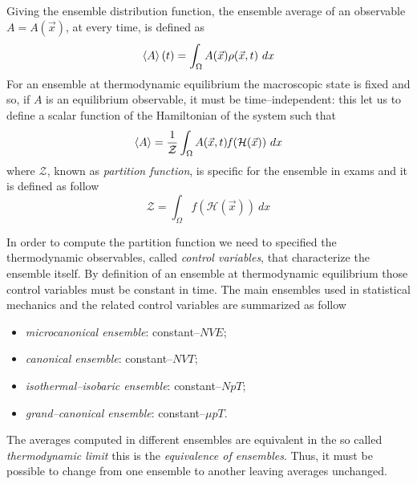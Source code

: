Giving the ensemble distribution function, the ensemble average of an observable $A=A(\vec x)$, at every time, is defined as
\begin{equation*}
	\left \langle A \right \rangle(t) = \int_\Omega A(\vec x)\rho(\vec x, t)\ dx
\end{equation*}
For an ensemble at thermodynamic equilibrium the macroscopic state is fixed and so, if $A$ is an equilibrium observable, it must be time--independent: this let us to define a scalar function of the Hamiltonian of the system such that
\begin{equation*}
	\left \langle A \right \rangle = \frac{1}{\mathcal{Z}} \int_\Omega A(\vec x, t) \mathit{f}(\mathcal{H}(\vec x))\ dx
\end{equation*}
where $\mathcal{Z}$, known as \textit{partition function}, is specific for the ensemble in exams and it is defined as follow
\begin{equation*}
	\mathcal{Z} = \int_\Omega \mathit{f}(\mathcal{H}(\vec x))\ dx
\end{equation*}

In order to compute the partition function we need to specified the thermodynamic observables, called \textit{control variables}, that characterize the ensemble itself. By definition of an ensemble at thermodynamic equilibrium those control variables must be constant in time. The main ensembles used in statistical mechanics and the related control variables are summarized as follow
\begin{itemize}
	\item \textit{microcanonical ensemble}: constant--$NVE$; %
	\item \textit{canonical ensemble}: constant--$NVT$; %
	\item \textit{isothermal--isobaric ensemble}: constant--$NpT$; %
	\item \textit{grand--canonical ensemble}: constant--$\mu pT$.%
\end{itemize}
The averages computed in different ensembles are equivalent in the so called \textit{thermodynamic limit} this is the \textit{equivalence of ensembles}. Thus, it must be possible to change from one ensemble to another leaving averages unchanged.

